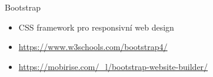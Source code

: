 \documentclass{beamer}
\begin{document}
\begin{frame}[fragile, shrink=0]{Bootstrap}
\begin{itemize}
	\item CSS framework pro responsivní web design
	\item \url{https://www.w3schools.com/bootstrap4/}
	\item \url{https://mobirise.com/_l/bootstrap-website-builder/}
\end{itemize}

\end{frame}
	  
\end{document}
